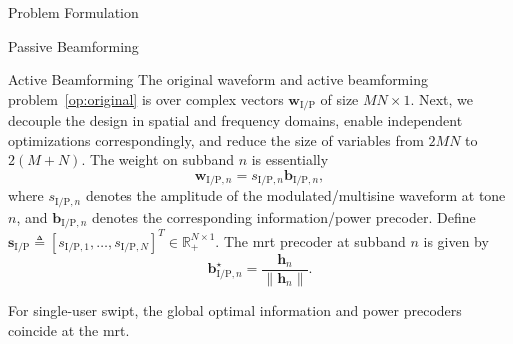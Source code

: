 \begin{section}{Problem Formulation}
\begin{subsection}{Passive Beamforming}
	\end{subsection}

	\begin{subsection}{Active Beamforming}
		The original waveform and active beamforming problem~\eqref{op:original} is over complex vectors $\boldsymbol{w}_{\mathrm{I/P}}$ of size $MN \times 1$. Next, we decouple the design in spatial and frequency domains, enable independent optimizations correspondingly, and reduce the size of variables from $2MN$ to $2(M+N)$. The weight on subband $n$ is essentially
		\begin{equation}\label{eq:w}
			\boldsymbol{w}_{\mathrm{I/P}, n} = s_{\mathrm{I/P}, n} \boldsymbol{b}_{\mathrm{I/P}, n},
		\end{equation}
		where $s_{\mathrm{I/P},n}$ denotes the amplitude of the modulated/multisine waveform at tone $n$, and $\boldsymbol{b}_{\mathrm{I/P}, n}$ denotes the corresponding information/power precoder. Define $\boldsymbol{s}_{\mathrm{I/P}} \triangleq [s_{\mathrm{I/P},1},\dots,s_{\mathrm{I/P},N}]^T \in \mathbb{R}_+^{N \times 1}$. The \gls{mrt} precoder at subband $n$ is given by
		\begin{equation}\label{eq:b_n}
			\boldsymbol{b}_{\mathrm{I/P}, n}^\star = \frac{\boldsymbol{h}_n}{\lVert{\boldsymbol{h}_n}\rVert}.
		\end{equation}

		\begin{proposition}\label{pr:mrt}
			For single-user \gls{swipt}, the global optimal information and power precoders coincide at the \gls{mrt}.
		\end{proposition}

	\end{subsection}



\end{section}
